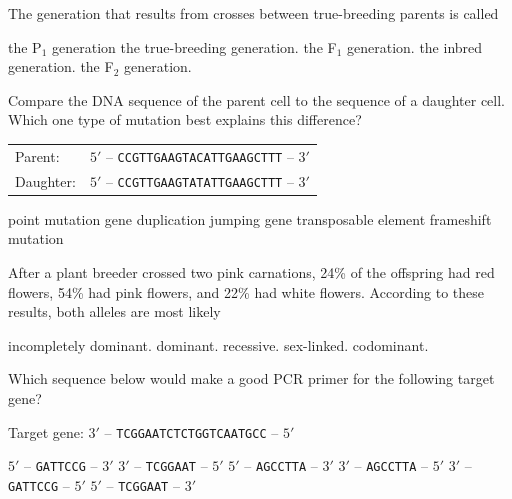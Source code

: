 \question
The generation that results from crosses between true-breeding parents is called

\begin{choices}
\choice the P$_1$ generation
\choice the true-breeding generation.
\correctchoice the F$_1$ generation.
\choice the inbred generation.
\choice the F$_2$ generation.
\end{choices}

\question
Compare the DNA sequence of the parent cell to the sequence of a daughter cell.  Which one type of mutation best explains this difference?

\vspace{0.4\baselineskip}
\begin{tabular}{@{}ll@{}}
Parent: & $5'$ -- \texttt{CCGTTGAAGTACATTGAAGCTTT} -- $3'$\\
Daughter: & $5'$ -- \texttt{CCGTTGAAGTATATTGAAGCTTT} -- $3'$\\
\end{tabular}

\begin{choices}
\correctchoice point mutation
\choice gene duplication
\choice jumping gene
\choice transposable element
\choice frameshift mutation
\end{choices}

\question
After a plant breeder crossed two pink carnations, 24\% of the offspring had red flowers, 54\% had pink flowers, and 22\% had white flowers. According to these results, both alleles are most likely

\begin{choices}
\correctchoice incompletely dominant.
\choice dominant.
\choice recessive.
\choice sex-linked.
\choice codominant.
\end{choices}

\question
Which sequence below would make a good PCR primer for the following target gene?

\vspace{0.4\baselineskip}
Target gene: $3'$ -- \texttt{TCGGAATCTCTGGTCAATGCC} -- $5'$

\begin{choices}
\choice $5'$ -- \texttt{GATTCCG} -- $3'$
\choice $3'$ -- \texttt{TCGGAAT} -- $5'$
\correctchoice $5'$ -- \texttt{AGCCTTA} -- $3'$
\choice $3'$ -- \texttt{AGCCTTA} -- $5'$
\choice $3'$ -- \texttt{GATTCCG} -- $5'$
\choice $5'$ -- \texttt{TCGGAAT} -- $3'$
\end{choices}

